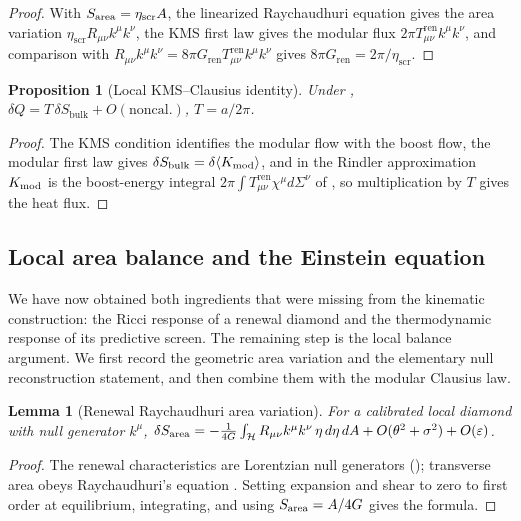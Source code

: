 \documentclass[11pt]{article}
\newtheorem{proposition}[theorem]{Proposition}
\newtheorem{lemma}[theorem]{Lemma}
\theoremstyle{definition}
\theoremstyle{remark}
\newcommand{\eps}{\varepsilon}
\newcommand{\Tren}{T^{\mathrm{ren}}}
\newcommand{\bulk}{\mathrm{bulk}}
\newcommand{\etaScr}{\eta_{\mathrm{scr}}}
\newcommand{\Gren}{G_{\mathrm{ren}}}
\begin{document}
\begin{proof}
With $S_{\rm area}=\etaScr A$, the linearized Raychaudhuri equation gives the area
variation $\etaScr R_{\mu\nu}k^\mu k^\nu$, the KMS first law gives the modular flux
$2\pi\Tren_{\mu\nu}k^\mu k^\nu$, and comparison with
$R_{\mu\nu}k^\mu k^\nu=8\pi\Gren\Tren_{\mu\nu}k^\mu k^\nu$ gives
$8\pi\Gren=2\pi/\etaScr$.
\end{proof}

\begin{proposition}[Local KMS--Clausius identity]
\label{prop:kms}
Under , $\delta Q=T\,\delta S_{\bulk}+O(\mathrm{noncal.})$,
$T=a/2\pi$.
\end{proposition}

\begin{proof}
The KMS condition identifies the modular flow with the boost flow, the modular
first law gives $\delta S_{\bulk}=\delta\langle K_{\rm mod}\rangle$, and in the
Rindler approximation $K_{\rm mod}$ is the boost-energy integral
$2\pi\int\Tren_{\mu\nu}\chi^\mu d\Sigma^\nu$ of \cite{CasiniHuertaMyers}, so
multiplication by $T$ gives the heat flux.
\end{proof}

\subsection{Local area balance and the Einstein equation}

We have now obtained both ingredients that were missing from the kinematic
construction: the Ricci response of a renewal diamond and the thermodynamic
response of its predictive screen.  The remaining step is the local balance
argument.  We first record the geometric area variation and the elementary null
reconstruction statement, and then combine them with the modular Clausius law.

\begin{lemma}[Renewal Raychaudhuri area variation]
\label{lem:raychaudhuri}
For a calibrated local diamond with null generator $k^\mu$,
$\delta S_{\rm area}=-\tfrac1{4G}\int_{\mathcal H}R_{\mu\nu}k^\mu k^\nu\,\eta\,d\eta\,dA
+O(\theta^2+\sigma^2)+O(\eps)$.
\end{lemma}

\begin{proof}
The renewal characteristics are Lorentzian null generators
(); transverse area obeys Raychaudhuri's equation
\cite{Raychaudhuri,Poisson}.  Setting expansion and shear to zero to first order at
equilibrium, integrating, and using $S_{\rm area}=A/4G$ gives the formula.
\end{proof}
\end{document}
